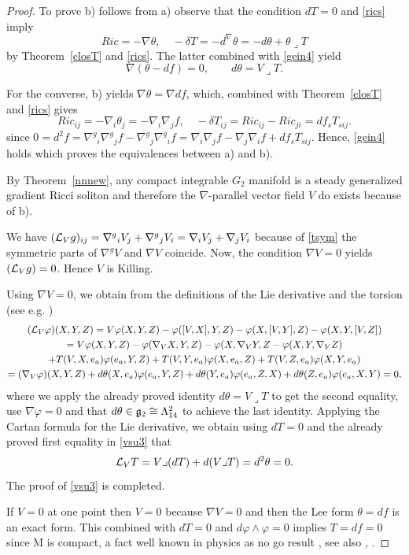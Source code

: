 \documentclass[10pt,british]{article}
\def\d{\delta}
\def\sb {{\nabla}}
\def\LC{{\nabla^g}}
\def\p{{\varphi}}
\begin{document}
\begin{proof}
To prove b) follows from a) observe that the  condition $dT=0$ and \eqref{rics} imply 
$$Ric=-\sb\theta, \quad -\d T=-d^{\sb}\theta=-d\theta+\theta\lrcorner T$$ by Theorem~\ref{closT} and \eqref{rics}. The latter  combined with \eqref{gein4} yield \[\sb(\theta-df)=0,\qquad d\theta=V\lrcorner T.\] 

For the converse, b)  yields $\sb\theta=\sb df$, which, combined  with Theorem~\ref{closT}  and \eqref{rics}  gives
\[Ric_{ij}=-\sb_i\theta_j=-\sb_i\sb_jf,\quad -\d T_{ij}=Ric_{ij}-Ric_{ji}=df_sT_{sij}.\]
since $0=d^2f=\LC_i\LC_jf-\LC_j\LC_if=\sb_i\sb_jf-\sb_j\sb_if+df_sT_{sij}$. 
Hence, \eqref{gein4} holds which proves the equivalences between a) and  b).

By Theorem~\ref{nnnew}, any compact integrable $G_2$ manifold is a steady generalized  gradient Ricci soliton and therefore the $\sb$-parallel vector field $V$ do exists because of b).


We have $( {\cal{L}}_Vg)_{ij}=\LC_iV_j+\LC_jV_i=\sb_iV_j+\sb_jV_i$ because of \eqref{tsym} the symmetric parts of $\LC V$  and  $\sb V$ coincide. Now, the condition $\sb V=0$ yields  $( {\cal{L}}_Vg)=0$. Hence $V$ is Killing.

Using $\sb V=0$, we obtain from the definitions of the Lie derivative and the torsion   (see e.g. \cite{KN}) 
\begin{multline*}%
( {\cal{L}}_V\p)(X,Y,Z)=V\p(X,Y,Z)-\p([V,X],Y,Z)-\p(X,[V,Y],Z)-\p(X,Y,[V,Z])\\=V\p(X,Y,Z)-\p(\sb_VX,Y,Z)-\p(X,\sb_VY,Z-\p(X,Y,\sb_VZ)\\+T(V,X,e_a)\p(e_a,Y,Z)+T(V,Y,e_a)\p(X,e_a,Z)+T(V,Z,e_a)\p(X,Y,e_a)\\=(\sb_V\p)(X,Y,Z)+d\theta(X,e_a)\p(e_a,Y,Z)+d\theta(Y,e_a)\p(e_a,Z,X)+d\theta(Z,e_a)\p(e_a,X,Y)=0,
\end{multline*}
where we apply the already proved identity $d\theta=V\lrcorner T$ to get the second equality, use $\sb \p=0$ and that $d\theta\in \frak{g}_2\cong\Lambda^2_{14}$  to achieve the last identity.   Applying the Cartan formula for the Lie derivative, we obtain using $dT=0$ and the already proved first equality in \eqref{vsu3} that
\[{\cal{L}}_VT=V\lrcorner(dT)+d(V\lrcorner T)=d^2\theta=0. \]
The proof of \eqref{vsu3} is completed.

If $V=0$ at one point then $V=0$ because $\sb V=0$ and then the Lee form $\theta=df$ is an exact form. This combined with $dT=0$ and $d\p\wedge\p=0$ implies $T=df=0$ since M is compact, a fact  well known in physics as no go result \cite{GMW,GMPW}, see also \cite[Theorem~4.7]{Wit}, \cite[Proposition~3.1]{CGFT}. 
\end{proof}
\end{document}
